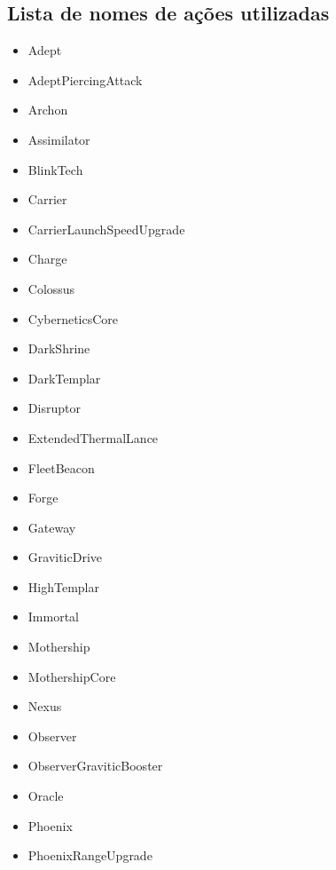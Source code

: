 %
%
	\begin{anexosenv}

\chapter{Lista de nomes de ações utilizadas}
\label{an:lista-acoes}

\begin{multicols}{2}
	\begin{itemize}
		\item Adept
		\item AdeptPiercingAttack
		\item Archon
		\item Assimilator
		\item BlinkTech
		\item Carrier
		\item CarrierLaunchSpeedUpgrade
		\item Charge
		\item Colossus
		\item CyberneticsCore
		\item DarkShrine
		\item DarkTemplar
		\item Disruptor
		\item ExtendedThermalLance
		\item FleetBeacon
		\item Forge
		\item Gateway
		\item GraviticDrive
		\item HighTemplar
		\item Immortal
		\item Mothership
		\item MothershipCore
		\item Nexus
		\item Observer
		\item ObserverGraviticBooster
		\item Oracle
		\item Phoenix
		\item PhoenixRangeUpgrade

\end{itemize}
\end{multicols}
\end{anexosenv}
